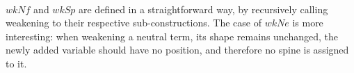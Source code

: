 \begin{code}
\AgdaSpace{}%
\AgdaSpace{}%
\AgdaSpace{}%
\<%
\\
%
\>[4]\AgdaSpace{}%
\AgdaSpace{}%
\AgdaSpace{}%
\AgdaSpace{}%
\AgdaSpace{}%
\AgdaSpace{}%
\AgdaSpace{}%
\<%
\\
%
\>[4]\AgdaSpace{}%
\AgdaSpace{}%
\AgdaSpace{}%
\AgdaSpace{}%
\AgdaSymbol{|}\AgdaSpace{}%
\AgdaSpace{}%
\AgdaSpace{}%
\AgdaSpace{}%
\AgdaSymbol{=}\AgdaSpace{}%
\AgdaSpace{}%
\AgdaSpace{}%
\AgdaSymbol{(}\AgdaSpace{}%
\AgdaSpace{}%
\AgdaSpace{}%
\AgdaSymbol{)}\<%
\\
%
\\[\AgdaEmptyExtraSkip]%
%
\>[2]\AgdaSpace{}%
\AgdaSymbol{:}\AgdaSpace{}%
\AgdaSymbol{(}\AgdaSpace{}%
\AgdaSymbol{:}\AgdaSpace{}%
\AgdaSpace{}%
\AgdaSpace{}%
\AgdaSymbol{)}\AgdaSpace{}%
\AgdaSpace{}%
\AgdaSpace{}%
\AgdaSymbol{(}\AgdaSpace{}%
\AgdaOperator{\AgdaFunction{-}}\AgdaSpace{}%
\AgdaSymbol{)}\AgdaSpace{}%
\AgdaSpace{}%
\AgdaSpace{}%
\AgdaSpace{}%
\AgdaSpace{}%
\AgdaSpace{}%
\AgdaSpace{}%
\<%
\\
%
\>[2]\AgdaSpace{}%
\AgdaSpace{}%
\AgdaSpace{}%
\AgdaSymbol{=}\AgdaSpace{}%
\<%
\\
%
\>[2]\AgdaSpace{}%
\AgdaSpace{}%
\AgdaSymbol{(}\AgdaSpace{}%
\AgdaOperator{\AgdaInductiveConstructor{,}}\AgdaSpace{}%
\AgdaSymbol{)}\AgdaSpace{}%
\AgdaSymbol{=}\AgdaSpace{}%
\AgdaSpace{}%
\AgdaSpace{}%
\AgdaSpace{}%
\AgdaOperator{\AgdaInductiveConstructor{,}}\AgdaSpace{}%
\AgdaSpace{}%
\AgdaSpace{}%
\<%
\end{code}

$wkNf$ and $wkSp$ are defined in a straightforward way, by recursively calling weakening to their respective sub-constructions. The case of $wkNe$ is more interesting: when weakening a neutral term, its shape remains unchanged, the newly added variable should have no position, and therefore no spine is assigned to it.

